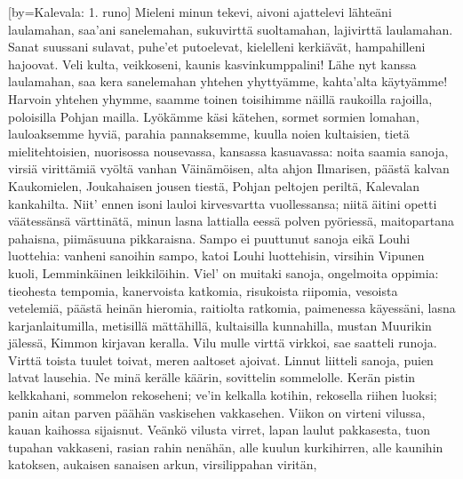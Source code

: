 %
[by={Kalevala: 1. runo}]
  \beginverse
    Mieleni minun tekevi,
    aivoni ajattelevi
    lähteäni laulamahan,
    saa'ani sanelemahan,
    sukuvirttä suoltamahan,
    lajivirttä laulamahan.
    Sanat suussani sulavat,
    puhe'et putoelevat,
    kielelleni kerkiävät,
    hampahilleni hajoovat.
    Veli kulta, veikkoseni,
    kaunis kasvinkumppalini!
    Lähe nyt kanssa laulamahan,
    saa kera sanelemahan
    yhtehen yhyttyämme,
    kahta'alta käytyämme!
    Harvoin yhtehen yhymme,
    saamme toinen toisihimme
    näillä raukoilla rajoilla,
    poloisilla Pohjan mailla.
  \endverse
  \beginverse
    Lyökämme käsi kätehen,
    sormet sormien lomahan,
    lauloaksemme hyviä,
    parahia pannaksemme,
    kuulla noien kultaisien,
    tietä mielitehtoisien,
    nuorisossa nousevassa,
    kansassa kasuavassa:
    noita saamia sanoja,
    virsiä virittämiä
    vyöltä vanhan Väinämöisen,
    alta ahjon Ilmarisen,
    päästä kalvan Kaukomielen,
    Joukahaisen jousen tiestä,
    Pohjan peltojen periltä,
    Kalevalan kankahilta.
    Niit' ennen isoni lauloi
    kirvesvartta vuollessansa;
    niitä äitini opetti
    väätessänsä värttinätä,
    minun lasna lattialla
    eessä polven pyöriessä,
    maitopartana pahaisna,
    piimäsuuna pikkaraisna.
    Sampo ei puuttunut sanoja
    eikä Louhi luottehia:
    vanheni sanoihin sampo,
    katoi Louhi luottehisin,
    virsihin Vipunen kuoli,
    Lemminkäinen leikkilöihin.
  \endverse
  \beginverse
    Viel' on muitaki sanoja,
    ongelmoita oppimia:
    tieohesta tempomia,
    kanervoista katkomia,
    risukoista riipomia,
    vesoista vetelemiä,
    päästä heinän hieromia,
    raitiolta ratkomia,
    paimenessa käyessäni,
    lasna karjanlaitumilla,
  \endverse
  \beginverse
    metisillä mättähillä,
    kultaisilla kunnahilla,
    mustan Muurikin jälessä,
    Kimmon kirjavan keralla.
    Vilu mulle virttä virkkoi,
    sae saatteli runoja.
    Virttä toista tuulet toivat,
    meren aaltoset ajoivat.
    Linnut liitteli sanoja,
    puien latvat lausehia.
    Ne minä kerälle käärin,
    sovittelin sommelolle.
    Kerän pistin kelkkahani,
    sommelon rekoseheni;
    ve'in kelkalla kotihin,
    rekosella riihen luoksi;
    panin aitan parven päähän
    vaskisehen vakkasehen.
    Viikon on virteni vilussa,
    kauan kaihossa sijaisnut.
  \endverse
  \beginverse
    Veänkö vilusta virret,
    lapan laulut pakkasesta,
    tuon tupahan vakkaseni,
    rasian rahin nenähän,
    alle kuulun kurkihirren,
    alle kaunihin katoksen,
    aukaisen sanaisen arkun,
    virsilippahan viritän,
